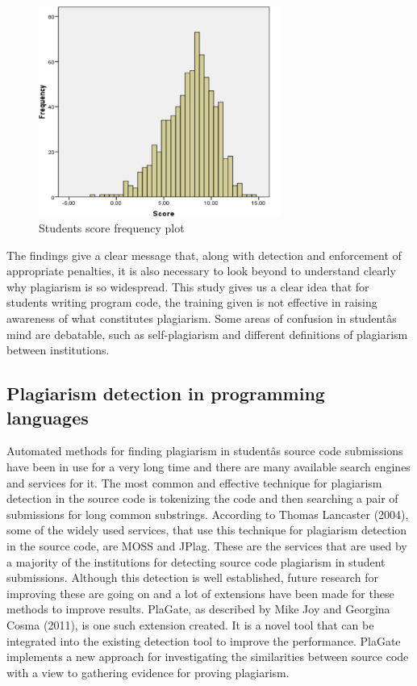 \documentclass[a4paper]{article}
\begin{document}
\begin{figure}
\centering
\includegraphics[width=3.12500in]{plotAAS.png}
\caption{Students score frequency plot}
\end{figure}

The findings give a clear message that, along with detection and
enforcement of appropriate penalties, it is also necessary to look
beyond to understand clearly why plagiarism is so widespread. This study
gives us a clear idea that for students writing program code, the
training given is not effective in raising awareness of what constitutes
plagiarism. Some areas of confusion in studentâs mind are debatable,
such as self-plagiarism and different definitions of plagiarism between
institutions.

\subsection{Plagiarism detection in programming
languages}\label{plagiarism-detection-in-programming-languages}

Automated methods for finding plagiarism in studentâs source code
submissions have been in use for a very long time and there are many
available search engines and services for it. The most common and
effective technique for plagiarism detection in the source code is
tokenizing the code and then searching a pair of submissions for long
common substrings. According to Thomas Lancaster (2004), some of the
widely used services, that use this technique for plagiarism detection
in the source code, are MOSS and JPlag. These are the services that are
used by a majority of the institutions for detecting source code
plagiarism in student submissions. Although this detection is well
established, future research for improving these are going on and a lot
of extensions have been made for these methods to improve results.
PlaGate, as described by Mike Joy and Georgina Cosma (2011), is one such
extension created. It is a novel tool that can be integrated into the
existing detection tool to improve the performance. PlaGate implements a
new approach for investigating the similarities between source code with
a view to gathering evidence for proving plagiarism.
\end{document}
